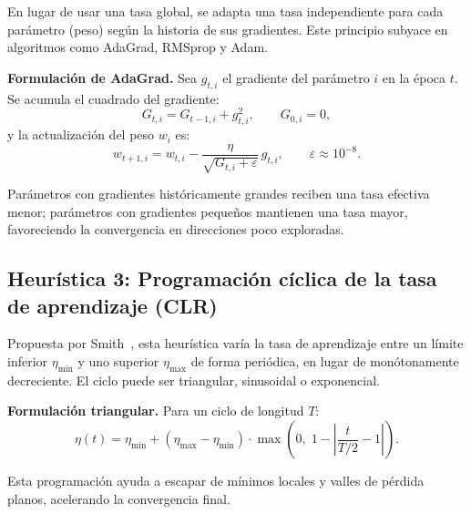 En lugar de usar una tasa global, se adapta una tasa independiente para cada parámetro (peso) según la historia de sus gradientes. Este principio subyace en algoritmos como AdaGrad, RMSprop y Adam.

\textbf{Formulación de AdaGrad.} Sea $g_{t,i}$ el gradiente del parámetro $i$ en la época $t$. Se acumula el cuadrado del gradiente:
\begin{equation}
    G_{t,i} = G_{t-1,i} + g_{t,i}^{2},
    \qquad G_{0,i} = 0,
\end{equation}
y la actualización del peso $w_i$ es:
\begin{equation}
    w_{t+1,i} = w_{t,i} - \frac{\eta}{\sqrt{G_{t,i} + \varepsilon}} \, g_{t,i},
    \qquad \varepsilon \approx 10^{-8}.
\end{equation}

Parámetros con gradientes históricamente grandes reciben una tasa efectiva menor; parámetros con gradientes pequeños mantienen una tasa mayor, favoreciendo la convergencia en direcciones poco exploradas.

\subsection{Heurística 3: Programación cíclica de la tasa de aprendizaje (CLR)}

Propuesta por Smith~\cite{smith2017cyclical}, esta heurística varía la tasa de aprendizaje entre un límite inferior $\eta_{\min}$ y uno superior $\eta_{\max}$ de forma periódica, en lugar de monótonamente decreciente. El ciclo puede ser triangular, sinusoidal o exponencial.

\textbf{Formulación triangular.} Para un ciclo de longitud $T$:
\begin{equation}
    \eta(t) = \eta_{\min} + (\eta_{\max} - \eta_{\min}) \cdot \max\!\left(0,\; 1 - \left|\frac{t}{T/2} - 1\right|\right).
\end{equation}

Esta programación ayuda a escapar de mínimos locales y valles de pérdida planos, acelerando la convergencia final.

